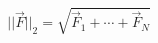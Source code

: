 \documentclass[preview]{standalone}
\begin{document}
\begin{varwidth}{50in}
  \begin{equation}
    || \vec{F} ||_{2} 
    = \sqrt{\vec{F}_1+ \cdots + \vec{F}_N}
    \nonumber
  \end{equation}
\end{varwidth}
\end{document}
